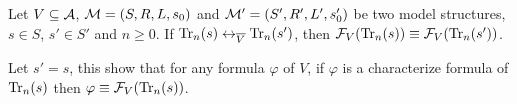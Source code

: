 \documentclass{article}
\begin{document}
\begin{lemma}\label{lem:Vb:TrFormula:Equ}
Let $V\subseteq {\cal A}$, ${\cal M}=(S, R, L, s_0)$ and ${\cal M}'=(S', R', L', s_0')$ be two model structures,
$s\in S$, $s'\in S'$ and $n\ge 0$. If $\textrm{Tr}_n(s) \leftrightarrow_{\overline V} \textrm{Tr}_n(s')$, then ${\cal F}_V(\textrm{Tr}_n(s)) \equiv {\cal F}_V(\textrm{Tr}_n(s'))$.
\end{lemma}
%
%
Let $s'=s$, this show that for any formula $\varphi$ of $V$, if $\varphi$ is a characterize formula of $\textrm{Tr}_n(s)$ then $\varphi \equiv {\cal F}_V(\textrm{Tr}_n(s))$.
\end{document}
